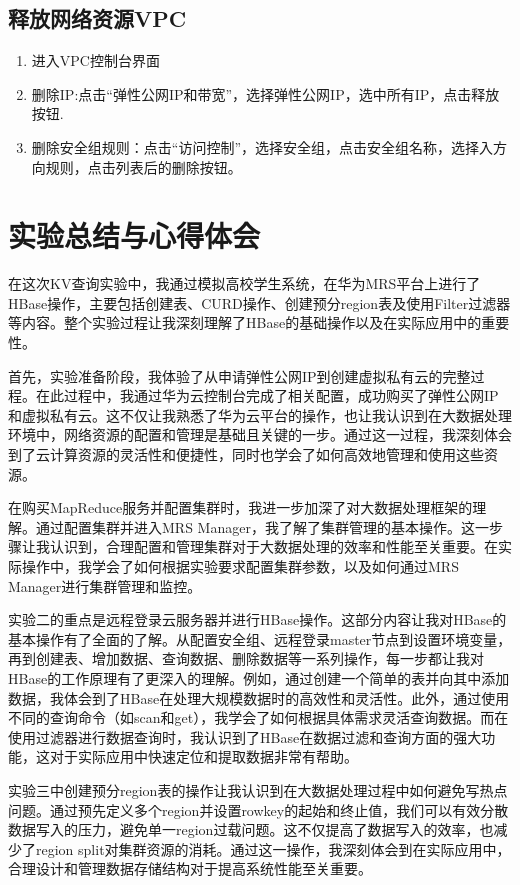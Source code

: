 \documentclass[12pt,hyperref,a4paper,UTF8]{ctexart}
\begin{document}
\subsection*{释放网络资源VPC}
\begin{enumerate}
    \item 进入VPC控制台界面
    \item 删除IP:点击“弹性公网IP和带宽”，选择弹性公网IP，选中所有IP，点击释放按钮.
    \item 删除安全组规则：点击“访问控制”，选择安全组，点击安全组名称，选择入方向规则，点击列表后的删除按钮。
\end{enumerate}




\section{实验总结与心得体会}

在这次KV查询实验中，我通过模拟高校学生系统，在华为MRS平台上进行了HBase操作，主要包括创建表、CURD操作、创建预分region表及使用Filter过滤器等内容。整个实验过程让我深刻理解了HBase的基础操作以及在实际应用中的重要性。

首先，实验准备阶段，我体验了从申请弹性公网IP到创建虚拟私有云的完整过程。在此过程中，我通过华为云控制台完成了相关配置，成功购买了弹性公网IP和虚拟私有云。这不仅让我熟悉了华为云平台的操作，也让我认识到在大数据处理环境中，网络资源的配置和管理是基础且关键的一步。通过这一过程，我深刻体会到了云计算资源的灵活性和便捷性，同时也学会了如何高效地管理和使用这些资源。

在购买MapReduce服务并配置集群时，我进一步加深了对大数据处理框架的理解。通过配置集群并进入MRS Manager，我了解了集群管理的基本操作。这一步骤让我认识到，合理配置和管理集群对于大数据处理的效率和性能至关重要。在实际操作中，我学会了如何根据实验要求配置集群参数，以及如何通过MRS Manager进行集群管理和监控。

实验二的重点是远程登录云服务器并进行HBase操作。这部分内容让我对HBase的基本操作有了全面的了解。从配置安全组、远程登录master节点到设置环境变量，再到创建表、增加数据、查询数据、删除数据等一系列操作，每一步都让我对HBase的工作原理有了更深入的理解。例如，通过创建一个简单的表并向其中添加数据，我体会到了HBase在处理大规模数据时的高效性和灵活性。此外，通过使用不同的查询命令（如scan和get），我学会了如何根据具体需求灵活查询数据。而在使用过滤器进行数据查询时，我认识到了HBase在数据过滤和查询方面的强大功能，这对于实际应用中快速定位和提取数据非常有帮助。

实验三中创建预分region表的操作让我认识到在大数据处理过程中如何避免写热点问题。通过预先定义多个region并设置rowkey的起始和终止值，我们可以有效分散数据写入的压力，避免单一region过载问题。这不仅提高了数据写入的效率，也减少了region split对集群资源的消耗。通过这一操作，我深刻体会到在实际应用中，合理设计和管理数据存储结构对于提高系统性能至关重要。
\end{document}
